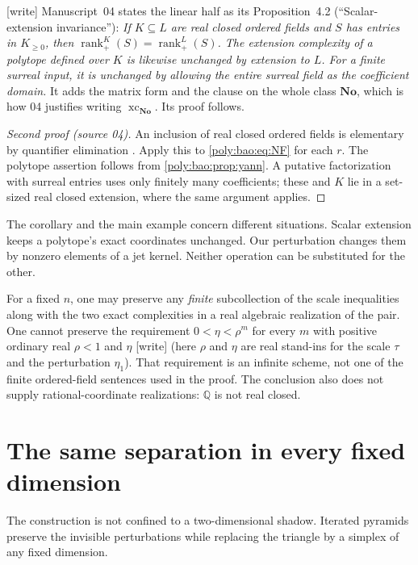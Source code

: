 \documentclass[11pt,a4paper]{article}
\numberwithin{equation}{section}
\theoremstyle{plain}
\newcommand{\wtag}{\textup{[write]}}%
\newcommand{\No}{\mathbf{No}}
\newcommand{\Q}{\mathbb Q}
\newcommand{\xc}{\operatorname{xc}}
\newcommand{\nrk}{\operatorname{rank}_{+}}
\begin{document}
\begin{remark}\label{poly:bao:rem:scalar}
\wtag{} Manuscript~04 states the linear half as its Proposition~4.2
(``Scalar-extension invariance''): \emph{If $K\subseteq L$ are real closed
ordered fields and $S$ has entries in $K_{\geq0}$, then
$\nrk^K(S)=\nrk^L(S)$. The extension complexity of a polytope defined over
$K$ is likewise unchanged by extension to $L$. For a finite surreal input,
it is unchanged by allowing the entire surreal field as the coefficient
domain.} It adds the matrix form and the clause on the whole class $\No$,
which is how 04 justifies writing $\xc_{\No}$. Its proof follows.
\end{remark}
\begin{proof}[Second proof (source 04)]
An inclusion of real closed ordered fields is elementary by quantifier
elimination \cite{bao:Tarski,bao:Collins}. Apply this to \eqref{poly:bao:eq:NF} for each
$r$. The polytope assertion follows from \cref{poly:bao:prop:yann}. A putative
factorization with surreal entries uses only finitely many coefficients;
these and $K$ lie in a set-sized real closed extension, where the same
argument applies.
\end{proof}

The corollary and the main example concern different situations. Scalar
extension keeps a polytope's exact coordinates unchanged. Our perturbation
changes them by nonzero elements of a jet kernel. Neither operation can
be substituted for the other.

For a fixed $n$, one may preserve any \emph{finite} subcollection of the
scale inequalities along with the two exact complexities in a real
algebraic realization of the pair. One cannot preserve the requirement
$0<\eta<\rho^m$ for every $m$ with positive ordinary real $\rho<1$ and
$\eta$ \wtag{} (here $\rho$ and $\eta$ are real stand-ins for the scale
$\tau$ and the perturbation $\eta_1$). That requirement is an infinite scheme, not one of the finite
ordered-field sentences used in the proof. The conclusion also does not
supply rational-coordinate realizations: $\Q$ is not real closed.

\section{The same separation in every fixed dimension}\label{poly:ic:sec:higher}

The construction is not confined to a two-dimensional shadow. Iterated
pyramids preserve the invisible perturbations while replacing the triangle
by a simplex of any fixed dimension.
\end{document}
